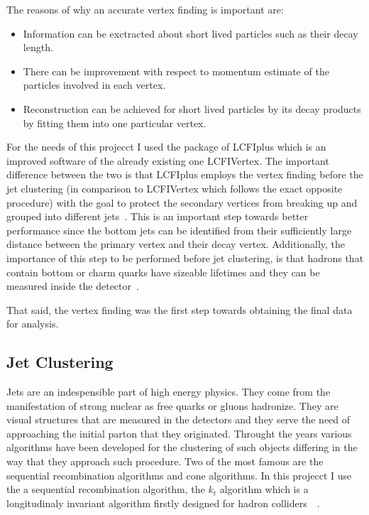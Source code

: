 \documentclass[12pt,a4paper]{report}
\begin{document}
The reasons of why an accurate vertex finding is important are:

\begin{itemize}
 \item Information can be exctracted about short lived particles such as their decay length.
 \item There can be improvement with respect to momentum estimate of the particles involved in each 
 vertex.
 \item Reconstruction can be achieved for short lived particles by its decay products by fitting them
 into one particular vertex.
\end{itemize}



For the needs of this projecct I used the package of LCFIplus which is an improved software of the already 
existing one LCFIVertex. The important difference between the  two is that LCFIplus employs the vertex finding 
before the jet clustering (in comparison to LCFIVertex which follows the exact opposite procedure) with the 
goal to protect the secondary vertices from breaking up and grouped into different jets~\cite{suehara2016lcfiplus}.
This is an important step towards better performance since the bottom jets can be identified from their 
sufficiently large distance between the primary vertex and their decay vertex. Additionally, the importance
of this step to be performed before jet clustering, is that hadrons that contain bottom or charm quarks 
have sizeable lifetimes and they can be measured inside the detector~\cite{suehara2016lcfiplus}.


That said, the vertex finding was the first step towards obtaining the final data for analysis.

\subsection{Jet Clustering}

Jets are an indespensible part of high energy physics. They come from the manifestation of strong nuclear
as free quarks or gluons hadronize. They are visual structures that are measured in the detectors and they
serve the need of approaching the initial parton that they originated. Throught the years various algorithms 
have been developed for the clustering of such objects differing in the way that they approach such procedure.
Two of the most famous are the sequential recombination algorithms and cone algorithms. In this projecct I use
the a sequential recombination algorithm, the $k_{t}$ algorithm which is a longitudinaly invariant algorithm
firstly designed for hadron colliders~\cite{catani1993longitudinally}~\cite{ellis1993successive}.
\end{document}
